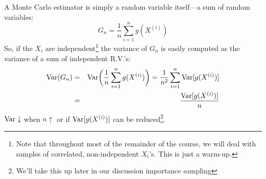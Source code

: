 A Monte Carlo estimator is simply a random variable itself---a sum of random variables:
\[
	G_n = \frac{1}{n}\sum_{i=1}^n g(X^{(i)})
\]
So, if the $X_i$ are independent\footnote{Note that throughout most of the remainder of the course, we will deal with samples of correlated, non-independent $X_i$'s.  This is just a warm-up.} the variance of $G_n$ is easily computed as the variance of a sum of independent R.V.'s:
\begin{eqnarray}
	{\mathrm{Var}}(G_n) & = & {\mathrm{Var}}\biggl(\frac{1}{n}\sum_{i=1}^n g(X^{(i)})\biggr) = \frac{1}{n^2}\sum_{i=1}^n {\mathrm{Var}}[g(X^{(i)})] \nonumber \\
	&=& \frac{{\mathrm{Var}}[g(X^{(i)})]}{n} \nonumber
\end{eqnarray}
${\mathrm{Var}} \downarrow$ when $n\uparrow$ or if ${\mathrm{Var}}[g(X^{(i)})]$ can be reduced\footnote{We'll take this up later in our discussion importance sampling}.







